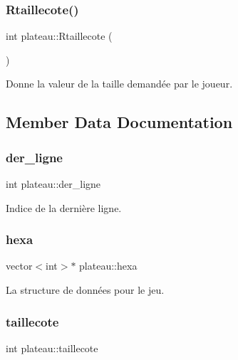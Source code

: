 \subsubsection{\texorpdfstring{Rtaillecote()}{Rtaillecote()}}
{\footnotesize\ttfamily int plateau\+::\+Rtaillecote (\begin{DoxyParamCaption}{ }\end{DoxyParamCaption})\hspace{0.3cm}{\ttfamily [inline]}}



Donne la valeur de la taille demandée par le joueur. 



\subsection{Member Data Documentation}
\mbox{\label{classplateau_a3ed9526208bf28f0063bdf7c0efb9391}} 
\subsubsection{\texorpdfstring{der\+\_\+ligne}{der\_ligne}}
{\footnotesize\ttfamily int plateau\+::der\+\_\+ligne\hspace{0.3cm}{\ttfamily [private]}}



Indice de la dernière ligne. 

\mbox{\label{classplateau_a1cf99c526864d850ffe97f5507ab1bcb}} 
\subsubsection{\texorpdfstring{hexa}{hexa}}
{\footnotesize\ttfamily vector$<$int$>$$\ast$ plateau\+::hexa\hspace{0.3cm}{\ttfamily [private]}}



La structure de données pour le jeu. 

\mbox{\label{classplateau_a3a22c0369525080629eba2ac2edab03e}} 
\subsubsection{\texorpdfstring{taillecote}{taillecote}}
{\footnotesize\ttfamily int plateau\+::taillecote\hspace{0.3cm}{\ttfamily [private]}}




